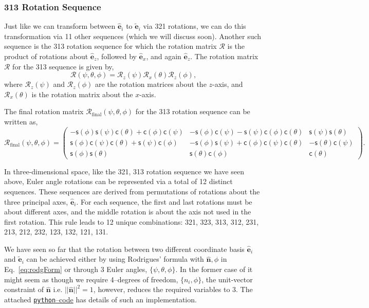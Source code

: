 \documentclass{article}
\def\nh{\hat{\mathbf{n}}}
\def\eh{\hat{\mathbf{e}}}
\def\et{\tilde{\mathbf{e}}}
\def\R{\mathcal{R}}
\def\c{\textsf{c}}
\def\s{\textsf{s}}
\def\nh{\hat{\mathbf{n}}}
\begin{document}
\subsubsection*{313 Rotation Sequence}
Just like we can transform between $\eh_i$ to $\et_i$ via 321 rotations, we can do this transformation via 11 other sequences (which we will discuss soon). Another such sequence is the 313 rotation sequence for which the rotation matrix $\R$ is the product of rotations about $\eh_z$, followed by $\eh_x$, and again $\eh_z$. The rotation matrix  $\R$ for the 313 sequence is given by,
\[
  \R (\psi, \theta, \phi) = \R_z(\psi) \R_x(\theta) \R_z(\phi),
\]
where \( \R_z(\psi) \) and \( \R_z(\phi) \) are the rotation matrices about the $z$-axis, and \( \R_x(\theta) \) is the rotation matrix about the $x$-axis. 

\noindent The final rotation matrix \( \R_{\text{final}} (\psi, \theta, \phi) \) for the 313 rotation sequence can be written as,
\[
\R_{\text{final}} (\psi, \theta, \phi) = \begin{pmatrix}
-\s(\phi)\s(\psi)\c(\theta) + \c(\phi)\c(\psi) & -\s(\phi)\c(\psi) - \s(\psi)\c(\phi)\c(\theta) & \s(\psi)\s(\theta) \\
\s(\phi)\c(\psi)\c(\theta) + \s(\psi)\c(\phi) & -\s(\phi)\s(\psi) + \c(\phi)\c(\psi)\c(\theta) & -\s(\theta)\c(\psi) \\
\s(\phi)\s(\theta) & \s(\theta)\c(\phi) & \c(\theta)
\end{pmatrix}.
\]

\noindent In three-dimensional space, like the 321, 313 rotation sequence we have seen above, Euler angle rotations can be represented via a total of 12 distinct sequences. These sequences are derived from permutations of rotations about the three principal axes, $\eh_i$. For each sequence, the first and last rotations must be about different axes, and the middle rotation is about the axis not used in the first rotation. This rule leads to 12 unique combinations: 321, 323, 313, 312, 231, 213, 212, 232, 123, 132, 121, 131.

We have seen so far that the rotation between two different coordinate basis $\eh_i$ and $\et_i$ can be achieved either by using Rodrigues' formula with $\nh, \phi$ in Eq.~\ref{eq:rodgForm} or through 3 Euler angles, $\{\psi, \theta, \phi\}$. In the former case of it might seem as though we require 4--degrees of freedom, $\{ n_i, \phi \}$, the unit-vector constraint of $\nh$ i.e. $||\nh||^2 = 1$, however, reduces the required variables to 3. The attached \href{https://github.com/sgangaprasath/RotationTut/blob/main/Rotations.ipynb}{\texttt{python}--code} has details of such an implementation.
\end{document}
